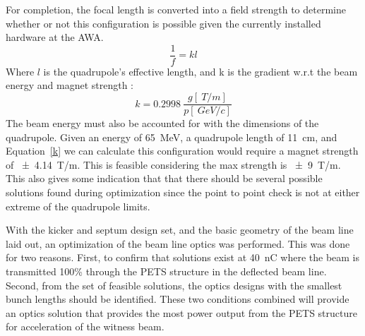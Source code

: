 For completion, the focal length is converted into a field strength 
to determine whether or not this configuration is possible given 
the currently installed hardware at the AWA. 
\begin{equation}
\frac{1}{f} = kl 
\end{equation}
Where $l$ is the quadrupole's effective length, and k is the gradient w.r.t 
the beam energy and magnet strength \cite{Wiedemann}:
\begin{equation}
k = \SI{0.2998}{} \frac{g[\SI{}{T/m}]}{p [\SI{}{GeV/c}]}\label{k}
\end{equation}
The beam energy must also be accounted for with the dimensions of the quadrupole. 
Given an energy of \SI{65}{MeV}, a quadrupole length of \SI{11}{cm}, 
and Equation~\ref{k} we can calculate this configuration would require a 
magnet strength of \SI{\pm4.14}{T/m}. This is feasible considering the 
max strength is \SI{\pm9}{T/m}. This also gives some indication that 
that there should be several possible solutions found during optimization
since the point to point check is not at either extreme of the quadrupole limits.

\label{failed}
 
With the kicker and septum design set, 
and the basic geometry of the beam line laid out, 
an optimization of the beam line optics was performed.
This was done for two reasons. First, to confirm that solutions 
exist at \SI{40}{nC} where the beam is transmitted 100\% through the PETS structure in the deflected beam line.
Second, from the set of feasible solutions, the optics designs with the smallest bunch lengths should be identified.
These two conditions combined will provide an optics solution that provides the most power output from the PETS structure for acceleration of the witness beam. 

